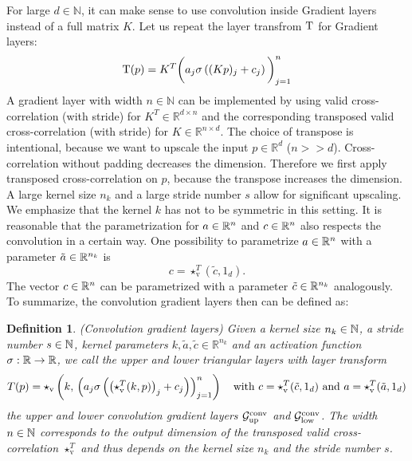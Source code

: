\documentclass[twoside,a4paper]{article}
\newtheorem{definition}{Definition}
\begin{document}
For large $d \in \mathbb{N}$, it can make sense to use convolution inside Gradient layers 
instead of a full matrix $K$. Let us repeat the layer transfrom $\mathrm{T}$ for Gradient layers:
\begin{equation*}
	\mathrm{T}(p) = K^T \bigg( a_j \sigma \left( (Kp)_j + c_j \right) \bigg)_{j=1}^n
\end{equation*}
A gradient layer with width $n \in \mathbb{N}$ can be implemented by 
using valid cross-correlation (with stride) for $K^T \in \mathbb{R}^{d \times n}$ and the
corresponding transposed valid cross-correlation (with stride) for $K \in \mathbb{R}^{n \times d}$.
The choice of transpose is intentional, because we want to upscale the input $p \in \mathbb{R}^d$ ($n >> d$). 
Cross-correlation without padding decreases the dimension. Therefore we first apply 
transposed cross-correlation on $p$, because the transpose increases the dimension.
A large kernel size $n_k$ and a large stride number $s$ allow for significant upscaling.
We emphasize that the kernel $k$ has not to be symmetric in this setting. 
It is reasonable that the parametrization for $a \in \mathbb{R}^n$ and $c \in \mathbb{R}^n$ also respects
the convolution in a certain way.
One possibility to parametrize $a \in \mathbb{R}^n$ with a parameter $\tilde{a} \in \mathbb{R}^{n_k}$ is
\begin{equation*}
	c = \star_{\text{v}}^T(\tilde{c},1_d)
	.
\end{equation*}
The vector $c \in \mathbb{R}^n$ can be parametrized with a parameter $\tilde{c} \in \mathbb{R}^{n_k}$ analogously.
To summarize, the convolution gradient layers then can be defined as:
\begin{definition}
	(Convolution gradient layers)
	Given a kernel size $n_k \in \mathbb{N}$, a stride number $s \in \mathbb{N}$,
	kernel parameters $k,\tilde{a},\tilde{c} \in \mathbb{R}^{n_k}$ and
	an activation function $\sigma : \mathbb{R} \to \mathbb{R}$,
	we call the upper and lower triangular layers with layer transform
	\begin{equation*}
		T(p) = \star_{\text{v}} \left( k, \, \left( a_j \sigma \left( \left( \star_{\text{v}}^T(k,p) \right)_j + c_j \right) \right)_{j=1}^n \right) 
		\quad
		\text{with } c = \star_{\text{v}}^T(\tilde{c},1_d) 
		\text{ and } a = \star_{\text{v}}^T(\tilde{a},1_d)
	\end{equation*}
	the upper and lower convolution gradient layers 
	$\mathcal{G}_{\text{up}}^{\text{conv}}$ and $\mathcal{G}_{\text{low}}^{\text{conv}}$.
	The width $n \in \mathbb{N}$ corresponds to the output dimension of the transposed valid cross-correlation $\star_{\text{v}}^T$
	and thus depends on the kernel size $n_k$ and the stride number $s$.
\end{definition}
\end{document}
